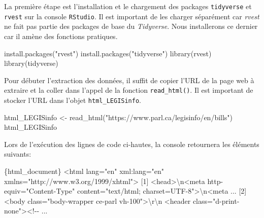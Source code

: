 \documentclass[
  letterpaper,
  DIV=11,
  numbers=noendperiod,
  oneside]{scrreprt}
\newenvironment{Shaded}{\begin{snugshade}}{\end{snugshade}}
\newcommand{\DataTypeTok}[1]{\textcolor[rgb]{0.68,0.00,0.00}{#1}}
\newcommand{\ErrorTok}[1]{\textcolor[rgb]{0.68,0.00,0.00}{#1}}
\newcommand{\ExtensionTok}[1]{\textcolor[rgb]{0.00,0.23,0.31}{#1}}
\newcommand{\KeywordTok}[1]{\textcolor[rgb]{0.00,0.23,0.31}{#1}}
\newcommand{\NormalTok}[1]{\textcolor[rgb]{0.00,0.23,0.31}{#1}}
\newcommand{\OperatorTok}[1]{\textcolor[rgb]{0.37,0.37,0.37}{#1}}
\newcommand{\StringTok}[1]{\textcolor[rgb]{0.13,0.47,0.30}{#1}}
\newcommand{\VariableTok}[1]{\textcolor[rgb]{0.07,0.07,0.07}{#1}}
\begin{document}
La première étape est l'installation et le chargement des packages
\texttt{tidyverse} et \texttt{rvest} sur la console \texttt{RStudio}. Il
est important de les charger séparément car \emph{rvest} ne fait pas
partie des packages de base du \emph{Tidyverse}. Nous installerons ce
dernier car il amène des fonctions pratiques.

\begin{Shaded}
\begin{Highlighting}[]
\ExtensionTok{install.packages}\ErrorTok{(}\StringTok{"rvest"}\KeywordTok{)}
\ExtensionTok{install.packages}\ErrorTok{(}\StringTok{"tidyverse"}\KeywordTok{)}
\ExtensionTok{library}\ErrorTok{(}\ExtensionTok{rvest}\KeywordTok{)}
\ExtensionTok{library}\ErrorTok{(}\ExtensionTok{tidyverse}\KeywordTok{)}
\end{Highlighting}
\end{Shaded}

Pour débuter l'extraction des données, il suffit de copier l'URL de la
page web à extraire et la coller dans l'appel de la fonction
\texttt{read\_html()}. Il est important de stocker l'URL dans l'objet
\texttt{html\_LEGISinfo}.

\begin{Shaded}
\begin{Highlighting}[]
\ExtensionTok{html\_LEGISinfo} \OperatorTok{\textless{}}\NormalTok{{-} read\_html}\ErrorTok{(}\StringTok{"https://www.parl.ca/legisinfo/en/bills"}\KeywordTok{)}
\ExtensionTok{html\_LEGISinfo}
\end{Highlighting}
\end{Shaded}

Lors de l'exécution des lignes de code ci-hautes, la console retournera
les éléments suivants:

\begin{Shaded}
\begin{Highlighting}[]
\ExtensionTok{\{html\_document\}}
\OperatorTok{\textless{}}\NormalTok{html }\VariableTok{lang}\OperatorTok{=}\StringTok{"en"} \ExtensionTok{xml:lang=}\StringTok{"en"}\NormalTok{ xmlns=}\StringTok{"http://www.w3.org/1999/xhtml"}\OperatorTok{\textgreater{}}
\ExtensionTok{[1]} \OperatorTok{\textless{}}\NormalTok{head}\OperatorTok{\textgreater{}}\DataTypeTok{\textbackslash{}n}\OperatorTok{\textless{}}\NormalTok{meta http{-}equiv=}\StringTok{"Content{-}Type"} 
\VariableTok{content}\OperatorTok{=}\StringTok{"text/html; charset=UTF{-}8"}\OperatorTok{\textgreater{}}\DataTypeTok{\textbackslash{}n}\OperatorTok{\textless{}}\NormalTok{meta }
\ExtensionTok{...}
\ExtensionTok{[2]} \OperatorTok{\textless{}}\NormalTok{body class=}\StringTok{"body{-}wrapper ce{-}parl vh{-}100"}\OperatorTok{\textgreater{}}\DataTypeTok{\textbackslash{}r\textbackslash{}n}    
\OperatorTok{\textless{}}\NormalTok{header }\VariableTok{class}\OperatorTok{=}\StringTok{"d{-}print{-}none"}\OperatorTok{\textgreater{}\textless{}}\NormalTok{!{-}{-} }\ExtensionTok{...}
\end{Highlighting}
\end{Shaded}
\end{document}

